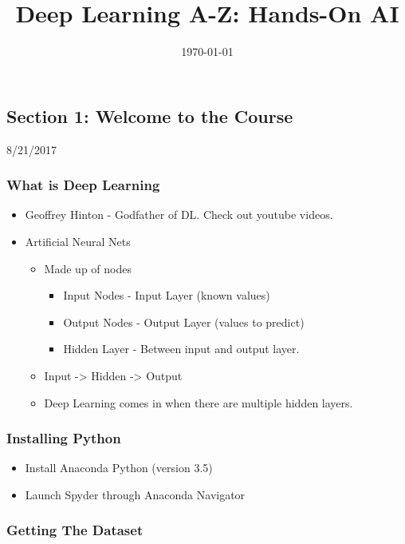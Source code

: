 \documentclass[11pt]{article}
\date{\today}
\title{Deep Learning A-Z: Hands-On AI}
\begin{document}
\maketitle
\tableofcontents


\subsection{Section 1: Welcome to the Course}
\label{sec:orgfed15d4}

8/21/2017

\subsubsection{What is Deep Learning}
\label{sec:orga3175be}

\begin{itemize}
\item Geoffrey Hinton - Godfather of DL. Check out youtube videos.
\item Artificial Neural Nets
\begin{itemize}
\item Made up of nodes
\begin{itemize}
\item Input Nodes - Input Layer (known values)
\item Output Nodes - Output Layer (values to predict)
\item Hidden Layer - Between input and output layer.
\end{itemize}
\item Input -> Hidden -> Output
\item Deep Learning comes in when there are multiple hidden layers.
\end{itemize}
\end{itemize}

\subsubsection{Installing Python}
\label{sec:org392d370}

\begin{itemize}
\item Install Anaconda Python (version 3.5)
\item Launch Spyder through Anaconda Navigator
\end{itemize}

\subsubsection{Getting The Dataset}
\label{sec:org2f66f8b}
\end{document}
